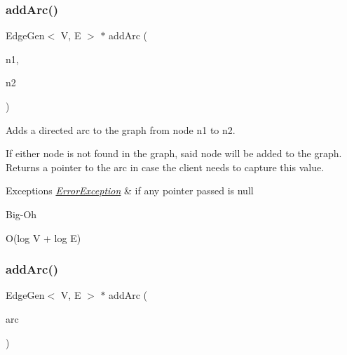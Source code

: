 \subsubsection{\texorpdfstring{add\+Arc()}{addArc()}\hspace{0.1cm}{\footnotesize\ttfamily [2/3]}}
{\footnotesize\ttfamily Edge\+Gen$<$ V, E $>$  $\ast$ add\+Arc (\begin{DoxyParamCaption}\item[{\mbox{\hyperlink{classVertexGen}{Vertex\+Gen}}$<$ V, E $>$  $\ast$}]{n1,  }\item[{\mbox{\hyperlink{classVertexGen}{Vertex\+Gen}}$<$ V, E $>$  $\ast$}]{n2 }\end{DoxyParamCaption})\hspace{0.3cm}{\ttfamily [inherited]}}



Adds a directed arc to the graph from node n1 to n2. 

If either node is not found in the graph, said node will be added to the graph. Returns a pointer to the arc in case the client needs to capture this value.


\begin{DoxyExceptions}{Exceptions}
{\em \mbox{\hyperlink{classErrorException}{Error\+Exception}}} & if any pointer passed is null \\
\hline
\end{DoxyExceptions}
\begin{DoxyRefDesc}{Big-\/\+Oh}
\item[\mbox{\hyperlink{BigOh__BigOh000043}{Big-\/\+Oh}}]O(log V + log E) \end{DoxyRefDesc}
\mbox{\label{classGraph_aa1b6553e579c03260253a2d731668dfa}} 
\subsubsection{\texorpdfstring{add\+Arc()}{addArc()}\hspace{0.1cm}{\footnotesize\ttfamily [3/3]}}
{\footnotesize\ttfamily Edge\+Gen$<$ V, E $>$  $\ast$ add\+Arc (\begin{DoxyParamCaption}\item[{Edge\+Gen$<$ V, E $>$  $\ast$}]{arc }\end{DoxyParamCaption})\hspace{0.3cm}{\ttfamily [inherited]}}



